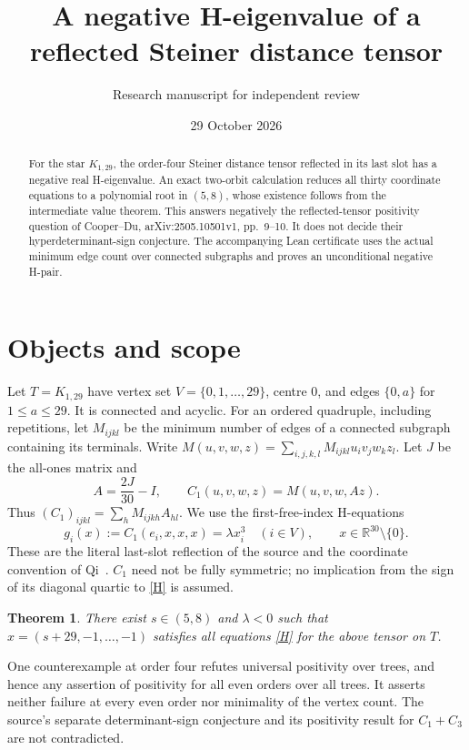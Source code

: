\documentclass[11pt]{article}
\title{A negative H-eigenvalue of a reflected Steiner distance tensor}
\author{Research manuscript for independent review}
\date{29 October 2026}
\newtheorem{theorem}{Theorem}
\newcommand{\R}{\mathbb R}
\begin{document}
\maketitle
\begin{abstract}
For the star $K_{1,29}$, the order-four Steiner distance tensor reflected in its last slot has a negative real H-eigenvalue. An exact two-orbit calculation reduces all thirty coordinate equations to a polynomial root in $(5,8)$, whose existence follows from the intermediate value theorem. This answers negatively the reflected-tensor positivity question of Cooper--Du, arXiv:2505.10501v1, pp.~9--10. It does not decide their hyperdeterminant-sign conjecture. The accompanying Lean certificate uses the actual minimum edge count over connected subgraphs and proves an unconditional negative H-pair.
\end{abstract}

\section{Objects and scope}
Let $T=K_{1,29}$ have vertex set $V=\{0,1,\ldots,29\}$, centre $0$, and edges $\{0,a\}$ for $1\leq a\leq29$. It is connected and acyclic. For an ordered quadruple, including repetitions, let $M_{ijkl}$ be the minimum number of edges of a connected subgraph containing its terminals. Write $M(u,v,w,z)=\sum_{i,j,k,l}M_{ijkl}u_iv_jw_kz_l$. Let $J$ be the all-ones matrix and
\[
 A=\frac{2J}{30}-I,\qquad C_1(u,v,w,z)=M(u,v,w,Az).
\]
Thus $(C_1)_{ijkl}=\sum_hM_{ijkh}A_{hl}$. We use the first-free-index H-equations
\begin{equation}\label{H}
 g_i(x):=C_1(e_i,x,x,x)=\lambda x_i^3\quad(i\in V),\qquad x\in\R^{30}\setminus\{0\}.
\end{equation}
These are the literal last-slot reflection of the source and the coordinate convention of Qi~\cite{Qi}. $C_1$ need not be fully symmetric; no implication from the sign of its diagonal quartic to \eqref{H} is assumed.

\begin{theorem}\label{main}
There exist $s\in(5,8)$ and $\lambda<0$ such that $x=(s+29,-1,\ldots,-1)$ satisfies all equations \eqref{H} for the above tensor on $T$.
\end{theorem}

One counterexample at order four refutes universal positivity over trees, and hence any assertion of positivity for all even orders over all trees. It asserts neither failure at every even order nor minimality of the vertex count. The source's separate determinant-sign conjecture and its positivity result for $C_1+C_3$ are not contradicted.
\end{document}
